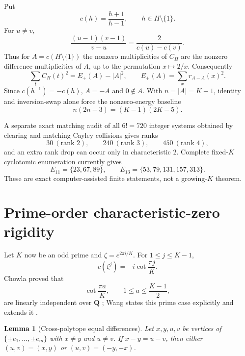 \documentclass[11pt]{article}
\newtheorem{lemma}[theorem]{Lemma}
\newcommand{\Q}{\mathbf Q}
\begin{document}
Put
\[
c(h)=\frac{h+1}{h-1},\qquad h\in H\setminus\{1\}.
\]
For $u\ne v$,
\begin{equation}\label{eq:cayley}
\frac{(u-1)(v-1)}{v-u}=\frac{2}{c(u)-c(v)}.
\end{equation}
Thus for $A=c(H\setminus\{1\})$ the nonzero multiplicities of $C_H$ are the
nonzero difference multiplicities of $A$, up to the permutation $x\mapsto2/x$.
Consequently
\begin{equation}\label{eq:energy}
\sum_t C_H(t)^2=E_+(A)-|A|^2,
\qquad E_+(A)=\sum_x r_{A-A}(x)^2.
\end{equation}
Since $c(h^{-1})=-c(h)$, $A=-A$ and $0\notin A$.  With $n=|A|=K-1$, identity
and inversion-swap alone force the nonzero-energy baseline
\begin{equation}\label{eq:baseline}
n(2n-3)=(K-1)(2K-5).
\end{equation}

A separate exact matching audit of all $6!=720$ integer systems obtained by
clearing and matching Cayley collisions gives ranks
\[
30\ (\text{rank }2),\qquad240\ (\text{rank }3),\qquad450\ (\text{rank }4),
\]
and an extra rank drop can occur only in characteristic $2$.  Complete
fixed-$K$ cyclotomic enumeration currently gives
\begin{equation}\label{eq:fixed-exceptions}
E_{11}=\{23,67,89\},\qquad
E_{13}=\{53,79,131,157,313\}.
\end{equation}
These are exact computer-assisted finite statements, not a growing-$K$
theorem.

\section{Prime-order characteristic-zero rigidity}

Let $K$ now be an odd prime and $\zeta=e^{2\pi i/K}$.  For
$1\le j\le K-1$,
\begin{equation}\label{eq:cot}
c(\zeta^j)=-i\cot\frac{\pi j}{K}.
\end{equation}
Chowla proved that
\[
\cot\frac{\pi a}{K},\qquad1\le a\le\frac{K-1}{2},
\]
are linearly independent over $\Q$ \cite{Chowla1970}; Wang states this prime
case explicitly and extends it \cite{Wang1982}.

\begin{lemma}[Cross-polytope equal differences]\label{lem:crosspoly}
Let $x,y,u,v$ be vertices of $\{\pm e_1,\ldots,\pm e_m\}$ with $x\ne y$ and
$u\ne v$.  If $x-y=u-v$, then either $(u,v)=(x,y)$ or
$(u,v)=(-y,-x)$.
\end{lemma}
\end{document}
